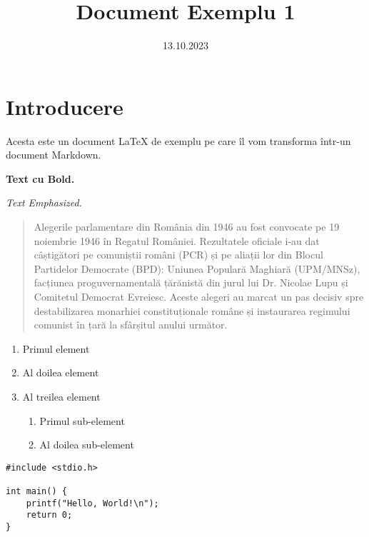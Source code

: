 \documentclass[a4paper, 12pt, twoside]{article}
\title{Document Exemplu 1}
\date{13.10.2023}
\begin{document}
\maketitle

\section{Introducere}\label{sec:intro}

Acesta este un document LaTeX de exemplu pe care îl vom transforma într-un document Markdown.

\textbf{Text cu Bold.}

\emph{Text Emphasized.}

\begin{quotation}
    Alegerile parlamentare din România din 1946 au fost convocate pe 19 noiembrie 1946 în Regatul României. Rezultatele oficiale i-au dat câștigători pe comuniștii români (PCR) și pe aliații lor din Blocul Partidelor Democrate (BPD):
Uniunea Populară Maghiară (UPM/MNSz), facțiunea proguvernamentală țărănistă din jurul lui Dr. Nicolae Lupu și Comitetul Democrat Evreiesc.
Aceste alegeri au marcat un pas decisiv spre destabilizarea monarhiei constituționale române și instaurarea regimului comunist în țară la sfârșitul anului următor.
\end{quotation}

\begin{enumerate}
    \item Primul element
    \item Al doilea element
    \item Al treilea element 
        \begin{enumerate}
            \item Primul sub-element
            \item Al doilea sub-element
        \end{enumerate}
\end{enumerate}

\begin{verbatim}
#include <stdio.h>

int main() {
    printf("Hello, World!\n");
    return 0;
}
\end{verbatim}
\end{document}
